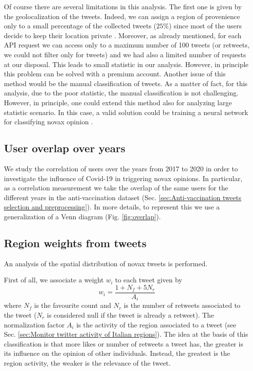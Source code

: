 \documentclass[prb,twocolumn,9pt]{revtex4-1}
\begin{document}
Of course there are several limitations in this analysis. The first one is given by the geolocalization of the tweets. Indeed, we can assign a region of provenience only to a small percentage of the collected tweets ($25\%$) since most of the users decide to keep their location private \cite{disease_prevention_review}. Moreover, as already mentioned, for each API request we can access only to a maximum number of 100 tweets (or retweets, we could not filter only for tweets) and we had also a limited number of requests at our disposal. This leads to small statistic in our analysis. However, in principle this problem can be solved with a premium account.
Another issue of this method would be the manual classification of tweets. As a matter of fact, for this analysis, due to the poor statistic, the manual classification is not challenging. However, in principle, one could extend this method also for analyzing large statistic scenario. In this case, a valid solution could be training a neural network for classifying novax opinion \cite{twitter_sentinel}.

\subsection{User overlap over years}
\label{sec:User overlap over years}

We study the correlation of users over the years from 2017 to 2020 in order to investigate the influence of Covid-19 in triggering novax opinions. In particular, as a correlation measurement we take the overlap of the same users for the different years in the anti-vaccination dataset (Sec. \ref{sec:Anti-vaccination tweets selection and preprocessing}). In more details, to represent this we use a generalization of a Venn diagram (Fig. \ref{fig:overlap}).


\subsection{Region weights from tweets}
\label{sec:Region weights from tweets}

An analysis of the spatial distribution of novax tweets is performed. 

First of all, we associate a weight $w_i$ to each tweet given by 
\begin{equation}
    w_i = \frac{1 + N_{f} + 5 N_{r}}{A_i}
    \label{eq:weight}
\end{equation}
where $N_f$ is the favourite count and $N_r$ is the number of retweets associated to the tweet ($N_r$ is considered null if the tweet is already a retweet). The normalization factor $A_i$ is the activity of the region associated to a tweet (see Sec. \ref{sec:Monitor twitter activity of Italian regions}). 
The idea at the basis of this classification is that more likes or number of retweets a tweet has, the greater is its influence on the opinion of other individuals. Instead, the greatest is the region activity, the weaker is the relevance of the tweet. 
\end{document}
